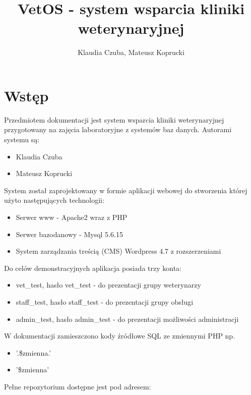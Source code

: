 \documentclass[10pt,a4paper]{article}
\author{Klaudia Czuba, Mateusz Koprucki}
\title{VetOS - system wsparcia kliniki weterynaryjnej}
\date{}
\begin{document}
	
	\maketitle
	\newpage
	\tableofcontents
	\newpage
	
	\section{Wstęp}
	Przedmiotem dokumentacji jest system wsparcia kliniki weterynaryjnej przygotowany na zajęcia laboratoryjne z systemów baz danych. Autorami systemu są:
		\begin{itemize}
			\item Klaudia Czuba
			\item Mateusz Koprucki
		\end{itemize}
	System został zaprojektowany w formie aplikacji webowej do stworzenia której użyto następujących technologii:
		\begin{itemize}
			\item Serwer www - Apache2 wraz z PHP
			\item Serwer bazodanowy - Mysql 5.6.15
			\item System zarządzania treścią (CMS) Wordpress 4.7 z rozszerzeniami
		\end{itemize}
\newline
	Do celów demonstracyjnych aplikacja posiada trzy konta:
		\begin{itemize}
			\item vet\_test, hasło vet\_test - do prezentacji grupy weterynarzy
			\item staff\_test, hasło staff\_test - do prezentacji grupy obsługi
			\item admin\_test, hasło  admin\_test - do prezentacji możliwości administracji
		\end{itemize}
	W dokumentacji zamieszczono kody źródłowe SQL ze zmiennymi PHP np. 
	\begin{itemize}
		\item '.\$zmienna.'
		\item '\$zmienna'
	\end{itemize}
\newline		
		Pełne repozytorium dostępne jest pod adresem: 
	
\end{document}
